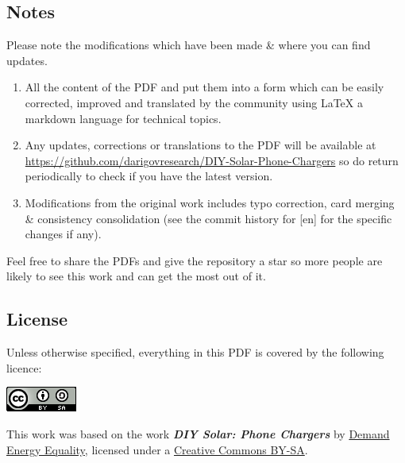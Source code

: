 \documentclass{article}
\theoremstyle{definition}
\theoremstyle{definition}
\theoremstyle{remark}
\begin{document}

  {\color{blue}\subsection*{Notes}} %
  \label{sub:notes}

    Please note the modifications which have been made \& where you can find updates.

    \begin{enumerate}
      \item All the content of the PDF and put them into a form which can be easily corrected, improved and translated by the community using LaTeX a markdown language for technical topics.
      \item Any updates, corrections or translations to the PDF will be available at \href{https://github.com/darigovresearch/DIY-Solar-Phone-Chargers}{https://github.com/darigovresearch/DIY-Solar-Phone-Chargers} so do return periodically to check if you have the latest version.
      \item Modifications from the original work includes typo correction, card merging \& consistency consolidation (see the commit history for [en] for the specific changes if any).
    \end{enumerate}

    Feel free to share the PDFs and give the repository a star so more people are likely to see this work and can get the most out of it.


  {\color{blue}\subsection*{License}} %
  \label{sub:license}

    Unless otherwise specified, everything in this PDF is covered by the following licence:

    \includegraphics[]{../Images/image_0_2_(license).png} \newline

    This work was based on the work \textbf{\textit{DIY Solar: Phone Chargers}} by \href{https://www.demandenergyequality.org/}{Demand Energy Equality}, licensed under a \href{https://creativecommons.org/licenses/by-sa/4.0/legalcode}{Creative Commons BY-SA}.
\end{document}
